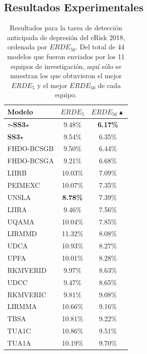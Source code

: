 \subsection{Resultados Experimentales}
\label{sec:tss3-result}



\begin{table}[t]
\centering
\caption{Resultados para la tarea de detección anticipada de depresión del eRisk 2018, ordenada por $ERDE_{50}$. Del total de 44 modelos que fueron enviados por los 11 equipos de investigación, aquí sólo se muestran los que obtuvieron el mejor $ERDE_{5}$ y el mejor $ERDE_{50}$ de cada equipo.}
\label{tab:results-d2018}
\begin{tabular}{l | c c}
\hline
Modelo & $ERDE_{5}$ & $ERDE_{50}\blacktriangle$ \\ \hline
\textbf{$\tau$-SS3}$\star$ & 9.48\% & \textbf{6.17\%} \\
\textbf{SS3}$\star$ & 9.54\% & 6.35\%  \\
FHDO-BCSGB & 9.50\% & 6.44\% \\
FHDO-BCSGA & 9.21\% & 6.68\% \\
LIIRB & 10.03\% & 7.09\% \\
PEIMEXC & 10.07\% & 7.35\% \\
UNSLA & \textbf{8.78\%} & 7.39\%  \\
LIIRA & 9.46\% & 7.56\% \\
UQAMA & 10.04\% & 7.85\% \\
LIRMMD & 11.32\% & 8.08\% \\
UDCA & 10.93\% & 8.27\% \\
UPFA & 10.01\% & 8.28\% \\
RKMVERID & 9.97\% & 8.63\% \\
UDCC & 9.47\% & 8.65\% \\
RKMVERIC & 9.81\% & 9.08\% \\
LIRMMA & 10.66\% & 9.16\% \\
TBSA & 10.81\% & 9.22\% \\
TUA1C & 10.86\% & 9.51\% \\
TUA1A & 10.19\% & 9.70\% \\
\hline
\end{tabular}
\end{table}

